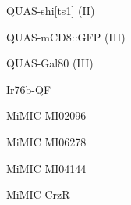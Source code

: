 \documentclass[17pt]{extarticle}
\begin{document}
\footnotesize
\vspace*{\fill}
\newpage{}
\vspace*{\fill}\begin{small}
QUAS-shi[ts1] (II) \\[0.5em]
\end{small}
\footnotesize
\vspace*{\fill}
\newpage{}
\vspace*{\fill}\begin{small}
QUAS-mCD8::GFP (III) \\[0.5em]
\end{small}
\footnotesize
\vspace*{\fill}
\newpage{}
\vspace*{\fill}\begin{small}
QUAS-Gal80 (III) \\[0.5em]
\end{small}
\footnotesize
\vspace*{\fill}
\newpage{}
\vspace*{\fill}\begin{large}
Ir76b-QF \\[0.5em]
\end{large}
\footnotesize
\vspace*{\fill}
\newpage{}
\vspace*{\fill}\begin{normalsize}
Mi{MIC} MI02096 \\[0.5em]
\end{normalsize}
\footnotesize
\vspace*{\fill}
\newpage{}
\vspace*{\fill}\begin{normalsize}
Mi{MIC} MI06278 \\[0.5em]
\end{normalsize}
\footnotesize
\vspace*{\fill}
\newpage{}
\vspace*{\fill}\begin{normalsize}
Mi{MIC} MI04144 \\[0.5em]
\end{normalsize}
\footnotesize
\vspace*{\fill}
\newpage{}
\vspace*{\fill}\begin{normalsize}
Mi{MIC} CrzR \\[0.5em]
\end{normalsize}
\footnotesize
\vspace*{\fill}
\end{document}
